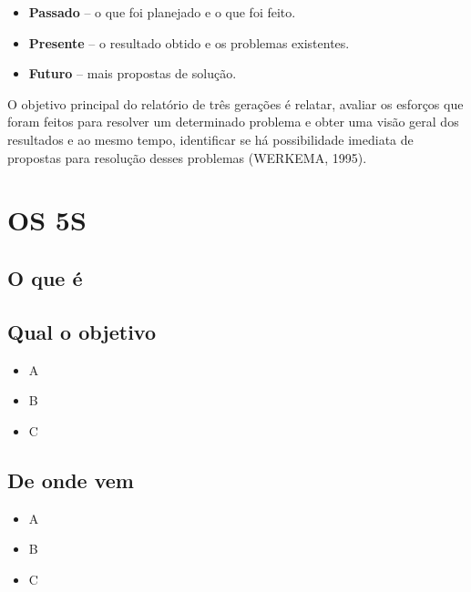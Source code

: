 \documentclass[
]{article}
\providecommand{\tightlist}{%
  \setlength{\itemsep}{0pt}\setlength{\parskip}{0pt}}
\begin{document}
\begin{itemize}
\item
  \textbf{Passado} -- o que foi planejado e o que foi feito.
\item
  \textbf{Presente} -- o resultado obtido e os problemas existentes.
\item
  \textbf{Futuro} -- mais propostas de solução.
\end{itemize}

O objetivo principal do relatório de três gerações é relatar, avaliar os esforços que foram feitos para resolver um determinado problema e obter uma visão geral dos resultados e ao mesmo tempo, identificar se há possibilidade imediata de propostas para resolução desses problemas (WERKEMA, 1995).

\hypertarget{os-5s}{%
\section{OS 5S}\label{os-5s}}

\hypertarget{o-que-uxe9-9}{%
\subsection*{O que é}\label{o-que-uxe9-9}}

\hypertarget{qual-o-objetivo-9}{%
\subsection*{Qual o objetivo}\label{qual-o-objetivo-9}}

\begin{itemize}
\tightlist
\item
  A
\item
  B
\item
  C
\end{itemize}

\hypertarget{de-onde-vem-9}{%
\subsection*{De onde vem}\label{de-onde-vem-9}}

\begin{itemize}
\tightlist
\item
  A
\item
  B
\item
  C
\end{itemize}
\end{document}
